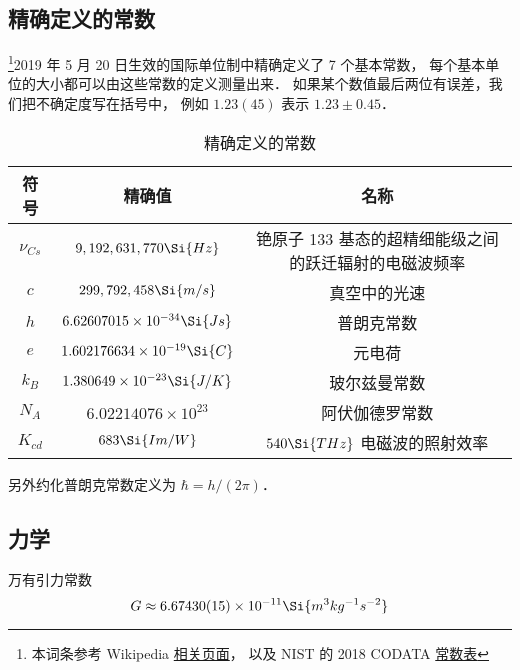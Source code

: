 
\begin{issues}
\issueTODO
{}
\end{issues}


\subsection{精确定义的常数}
\footnote{本词条参考 Wikipedia \href{https://en.wikipedia.org/wiki/Physical_constant}{相关页面}， 以及 NIST 的 2018 CODATA \href{https://physics.nist.gov/cuu/Constants/Table/allascii.txt}{常数表}}2019 年 5 月 20 日生效的国际单位制中精确定义了 7 个基本常数， 每个基本单位的大小都可以由这些常数的定义测量出来． 如果某个数值最后两位有误差，我们把不确定度写在括号中， 例如 $1.23(45)$ 表示 $1.23 \pm 0.45$．
\begin{table}[ht]
\centering
\caption{精确定义的常数}\label{Consts_tab1}
\begin{tabular}{|c|c|c|}
\hline
符号 & 精确值 & 名称 \\
\hline
$\nu_{Cs}$ & $9,192,631,770\Si{Hz}$ & 铯原子 133 基态的超精细能级之间的跃迁辐射的电磁波频率 \\
\hline
$c$ & $299,792,458\Si{m/s}$ & 真空中的光速 \\
\hline
$h$ & $6.62607015\times 10^{-34}\Si{Js}$ & 普朗克常数 \\
\hline
$e$ & $1.602176634\times 10^{-19}\Si{C} $ & 元电荷 \\
\hline
$k_B$ & $1.380649\times 10^{-23} \Si{J/K}$ & 玻尔兹曼常数 \\
\hline
$N_A$ & $6.02214076\times 10^{23} $ & 阿伏伽德罗常数 \\
\hline
$K_{cd}$ & $683\Si{Im/W}$ & $540\Si{THz}$ 电磁波的照射效率 \\
\hline
\end{tabular}
\end{table}
另外约化普朗克常数定义为 $\hbar = h/(2\pi)$．


\subsection{力学}
万有引力常数
\begin{equation}
G \approx 6.67430(15)\times 10^{-11} \Si{m^3 kg^{-1} s^{-2}}
\end{equation}


